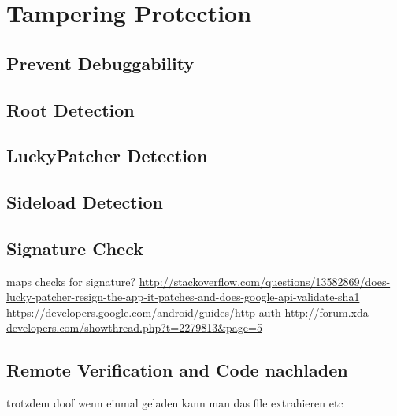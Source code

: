 \section{Tampering Protection} \label{section:tampering}

\subsection{Prevent Debuggability} \label{subsection:tampering-debuggable}
\subsection{Root Detection} \label{subsection:tampering-root}
\subsection{LuckyPatcher Detection} \label{subsection:tampering-luckypatcher}
\subsection{Sideload Detection} \label{subsection:tampering-sideload}
\subsection{Signature Check} \label{subsection:tampering-signature}
maps checks for signature?\newline
\url{http://stackoverflow.com/questions/13582869/does-lucky-patcher-resign-the-app-it-patches-and-does-google-api-validate-sha1}\newline
\url{https://developers.google.com/android/guides/http-auth}
\url{http://forum.xda-developers.com/showthread.php?t=2279813&page=5}\newline
\subsection{Remote Verification and Code nachladen} \label{subsection:external-remote}
trotzdem doof wenn einmal geladen kann man das file extrahieren etc
